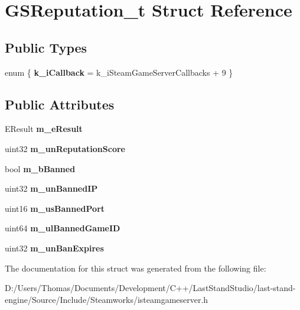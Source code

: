 \hypertarget{structGSReputation__t}{}\section{G\+S\+Reputation\+\_\+t Struct Reference}
\label{structGSReputation__t}
\subsection*{Public Types}
\begin{DoxyCompactItemize}
\item 
\hypertarget{structGSReputation__t_a84b56b8628581370c467938c18ed98c9}{}enum \{ {\bfseries k\+\_\+i\+Callback} = k\+\_\+i\+Steam\+Game\+Server\+Callbacks + 9
 \}\label{structGSReputation__t_a84b56b8628581370c467938c18ed98c9}

\end{DoxyCompactItemize}
\subsection*{Public Attributes}
\begin{DoxyCompactItemize}
\item 
\hypertarget{structGSReputation__t_a38d6f446a3486f1c3d715fb24f5065ed}{}E\+Result {\bfseries m\+\_\+e\+Result}\label{structGSReputation__t_a38d6f446a3486f1c3d715fb24f5065ed}

\item 
\hypertarget{structGSReputation__t_abd1ff33fbf43e257a5e1d7a9c11f52a7}{}uint32 {\bfseries m\+\_\+un\+Reputation\+Score}\label{structGSReputation__t_abd1ff33fbf43e257a5e1d7a9c11f52a7}

\item 
\hypertarget{structGSReputation__t_abe9c80b9a22286c1887f13bdd347a021}{}bool {\bfseries m\+\_\+b\+Banned}\label{structGSReputation__t_abe9c80b9a22286c1887f13bdd347a021}

\item 
\hypertarget{structGSReputation__t_a12aa547e5c6b984ed869c516dd94f524}{}uint32 {\bfseries m\+\_\+un\+Banned\+I\+P}\label{structGSReputation__t_a12aa547e5c6b984ed869c516dd94f524}

\item 
\hypertarget{structGSReputation__t_a4f16ac98752c4dc79c28231110260a15}{}uint16 {\bfseries m\+\_\+us\+Banned\+Port}\label{structGSReputation__t_a4f16ac98752c4dc79c28231110260a15}

\item 
\hypertarget{structGSReputation__t_a04bd8436228d5deefeced4784973e6ce}{}uint64 {\bfseries m\+\_\+ul\+Banned\+Game\+I\+D}\label{structGSReputation__t_a04bd8436228d5deefeced4784973e6ce}

\item 
\hypertarget{structGSReputation__t_a86eaac93872e9a3513c77150231b3c2e}{}uint32 {\bfseries m\+\_\+un\+Ban\+Expires}\label{structGSReputation__t_a86eaac93872e9a3513c77150231b3c2e}

\end{DoxyCompactItemize}


The documentation for this struct was generated from the following file\+:\begin{DoxyCompactItemize}
\item 
D\+:/\+Users/\+Thomas/\+Documents/\+Development/\+C++/\+Last\+Stand\+Studio/last-\/stand-\/engine/\+Source/\+Include/\+Steamworks/isteamgameserver.\+h\end{DoxyCompactItemize}
